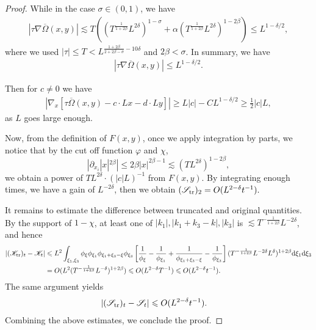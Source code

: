 \documentclass[UTF-8,reqno]{amsart}
\numberwithin{equation}{section}
\theoremstyle{definition}
\def\dif{{\mathord{{\rm d}}}}
\def\geq{\geqslant}
\def\leq{\leqslant}
\def\dif{{\mathord{{\rm d}}}}
\def\geq{\geqslant}
\def\leq{\leqslant}
\begin{document}
\begin{proof}
While in the case $\sigma\in(0,1)$, we have 
\begin{align*}
   |\tau  \nabla  \overline \Omega(x,y)|\lesssim T((T^{\frac{1}{1+2\beta}}L^{2\delta})^{1-\sigma}+\alpha (T^{\frac{1}{1+2\beta}}L^{2\delta})^{1-2\beta})\leq L^{1-\delta/2},
\end{align*}
where we used $|\tau|\leq T < L^{\frac{1+2\beta}{2+2\beta-\sigma}-10\delta}$ and $2\beta<\sigma$. In summary, we have 
\begin{align*}
   |\tau  \nabla  \overline \Omega(x,y)| \leq L^{1-\delta/2}.
\end{align*}

Then for $c\neq 0$ we have
\begin{align*}
|   \nabla_x[ \tau \overline\Omega(x,y)-c\cdot Lx-d\cdot Ly]|\geq L|c|-CL^{1-\delta/2}\geq \frac12|c|L,
\end{align*}
as $L$ goes large enough.


Now, from the definition of $F(x,y)$,  once we apply integration by parts, 
we notice that by the cut off function $\varphi$ and $\chi$,  $$|\partial_{x_i}|x|^{2\beta}|\leq 2\beta|x|^{2\beta-1}\lesssim (TL^{2\delta})^{1-2\beta},$$ 
we obtain a power of $TL^{2\delta}\cdot (|c|L)^{-1}$ from $F(x,y)$. By  integrating enough times, we have a gain of $L^{-2\delta}$,  then we obtain $(\mathscr S_{\rm tr})_2 =O(L^{2-\delta} t^{-1}).$

It remains to estimate the difference between truncated and original quantities. By the support of $1-\chi$, at least one of $|k_1|,|k_1+k_3-k|,|k_3|$ is $\lesssim T^{-{\frac{1}{1+2\beta}}}L^{-2\delta}$, and hence
\begin{align*}
 | ( \mathscr K_{\rm tr})_t- \mathscr K_t|&\leq   L^{2} \int_{\xi_1,\xi_3}\phi_\xi \phi_{\xi_1} \phi_{\xi_1+\xi_3-\xi} \phi_{\xi_3}  \left[ \frac{1}{\phi_\xi} - \frac{1}{\phi_{\xi_1}} + \frac{1}{\phi_{\xi_1+\xi_3-\xi}} - \frac{1}{\phi_{\xi_3}} \right](T^{-{\frac{1}{1+2\beta}}}L^{-2\delta} L^{\delta})^{1+2\beta}\dif \xi_1\dif \xi_3\\
 &=O(L^2(T^{-{\frac{1}{1+2\beta}}}L^{-\delta})^{1+2\beta})\leq O(L^{2-\delta}T^{-1})\leq O(L^{2-\delta}t^{-1}).
\end{align*} The same argument yields
\begin{align*}
 | (\mathscr S_{\rm tr})_t- \mathscr S_t|&\leq  O(L^{2-\delta}t^{-1}).
\end{align*}Combining the above estimates, we conclude the proof.
\end{proof}
\end{document}
